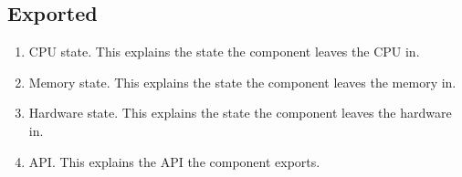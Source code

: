 \documentclass[a4paper,oneside]{memoir}
\begin{document}
\subsection{Exported}

\begin{enumerate}
    \item CPU state. This explains the state the component leaves the CPU in.
    \item Memory state. This explains the state the component leaves the memory in.
    \item Hardware state. This explains the state the component leaves the hardware in.
   \item API. This explains the API the component exports.
\end{enumerate}
\end{document}
